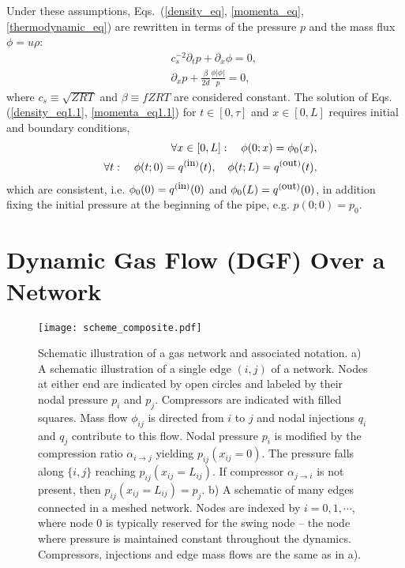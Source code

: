 \documentclass[10pt, conference, compsocconf]{IEEEtran}
\begin{document}
Under these assumptions, Eqs.~(\ref{density_eq}, \ref{momenta_eq}, \ref{thermodynamic_eq}) are rewritten in terms of the pressure $p$ and the mass flux $\phi=u\rho$:
\begin{eqnarray}
&& c_s^{-2}\partial_t p + \partial_x\phi=0,\label{density_eq1.1}\\
&& \partial_x p+ \frac{\beta}{2d}\frac{\phi|\phi|}{p}=0,\label{momenta_eq1.1}
\end{eqnarray}
where $c_s\equiv \sqrt{ZRT}$  and $\beta\equiv f Z R T$ are considered constant. The solution of Eqs. (\ref{density_eq1.1}, \ref{momenta_eq1.1}) for $t\in[0,\tau]$ and $x\in[0,L]$ requires initial and boundary conditions,
\begin{eqnarray}
&& \forall x\in[0,L]:\quad \phi(0;x)=\phi_0(x),\label{phi-0}\\
&& \forall t:\quad \phi(t;0)=q^{(\mbox{\small in})}(t),\quad \phi(t;L)=q^{(\mbox{\small out})}(t),
\label{phi-in-out}
\end{eqnarray}
which are consistent, i.e. $\phi_0(0)=q^{(\mbox{\small in})}(0)$ and $\phi_0(L)=q^{(\mbox{\small out})}(0)$, in addition fixing the initial pressure at the beginning of the pipe, e.g. $p(0;0)=p_0$.

\section{Dynamic Gas Flow (DGF) Over a Network}
\label{subsec:DGF}

\begin{figure}
\centering
\texttt{[image: scheme\_composite.pdf]}
\caption{Schematic illustration of a gas network and associated notation. a) A schematic illustration of a single edge $(i,j)$ of a network. Nodes at either end are indicated by open circles and labeled by their nodal pressure $p_i$ and $p_j$. Compressors are indicated with filled squares. Mass flow $\phi_{ij}$ is directed from $i$ to $j$ and nodal injections $q_i$ and $q_j$ contribute to this flow. Nodal pressure $p_i$ is modified by the compression ratio $\alpha_{i\to j}$ yielding $p_{ij}(x_{ij}=0)$.  The pressure falls along $\{i,j\}$ reaching $p_{ij}(x_{ij}=L_{ij})$.  If compressor $\alpha_{j\to i}$ is not present, then $p_{ij}(x_{ij}=L_{ij})=p_j$.  b) A schematic of many edges connected in a meshed network.  Nodes are indexed by $i=0,1,\cdots$, where node $0$ is typically reserved for the swing node -- the node where pressure is maintained constant throughout the dynamics. Compressors, injections and edge mass flows are the same as in a).
}
\label{fig:scheme}
\end{figure}
\end{document}
